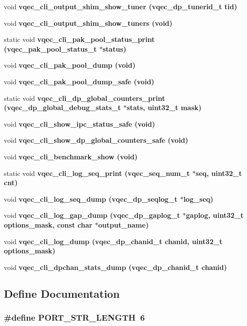 \begin{CompactItemize}
\item 
void \bf{vqec\_\-cli\_\-output\_\-shim\_\-show\_\-tuner} (vqec\_\-dp\_\-tunerid\_\-t tid)
\item 
void \bf{vqec\_\-cli\_\-output\_\-shim\_\-show\_\-tuners} (void)
\item 
static void \bf{vqec\_\-cli\_\-pak\_\-pool\_\-status\_\-print} (vqec\_\-pak\_\-pool\_\-status\_\-t $\ast$status)
\item 
void \bf{vqec\_\-cli\_\-pak\_\-pool\_\-dump} (void)
\item 
void \bf{vqec\_\-cli\_\-pak\_\-pool\_\-dump\_\-safe} (void)
\item 
static void \bf{vqec\_\-cli\_\-dp\_\-global\_\-counters\_\-print} (vqec\_\-dp\_\-global\_\-debug\_\-stats\_\-t $\ast$stats, uint32\_\-t mask)
\item 
void \bf{vqec\_\-cli\_\-show\_\-ipc\_\-status\_\-safe} (void)
\item 
void \bf{vqec\_\-cli\_\-show\_\-dp\_\-global\_\-counters\_\-safe} (void)
\item 
void \bf{vqec\_\-cli\_\-benchmark\_\-show} (void)
\item 
static void \bf{vqec\_\-cli\_\-log\_\-seq\_\-print} (vqec\_\-seq\_\-num\_\-t $\ast$seq, uint32\_\-t cnt)
\item 
void \bf{vqec\_\-cli\_\-log\_\-seq\_\-dump} (vqec\_\-dp\_\-seqlog\_\-t $\ast$log\_\-seq)
\item 
void \bf{vqec\_\-cli\_\-log\_\-gap\_\-dump} (vqec\_\-dp\_\-gaplog\_\-t $\ast$gaplog, uint32\_\-t options\_\-mask, const char $\ast$output\_\-name)
\item 
void \bf{vqec\_\-cli\_\-log\_\-dump} (vqec\_\-dp\_\-chanid\_\-t chanid, uint32\_\-t options\_\-mask)
\item 
void \bf{vqec\_\-cli\_\-dpchan\_\-stats\_\-dump} (vqec\_\-dp\_\-chanid\_\-t chanid)
\end{CompactItemize}


\subsection{Define Documentation}
\subsubsection{\setlength{\rightskip}{0pt plus 5cm}\#define PORT\_\-STR\_\-LENGTH~6}\label{vqec__cli__interface_8c_c7d4f5c1b87933baf01e236f42059b66}


